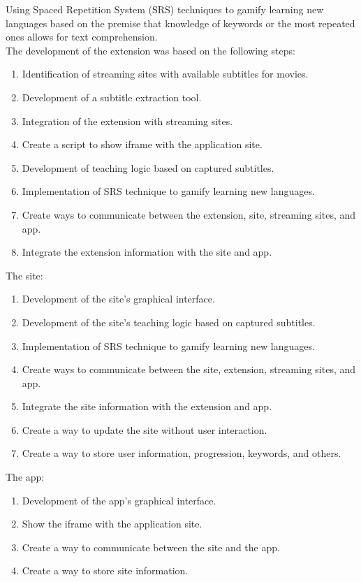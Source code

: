 \documentclass[12pt]{article}
\begin{document}
Using Spaced Repetition System (SRS) techniques to gamify learning new languages based on the premise that knowledge of keywords or the most repeated ones allows for text comprehension. \\
The development of the extension was based on the following steps: 
\begin{enumerate}
\item Identification of streaming sites with available subtitles for movies.
\item Development of a subtitle extraction tool.
\item Integration of the extension with streaming sites.
\item Create a script to show iframe with the application site.
\item Development of teaching logic based on captured subtitles.
\item Implementation of SRS technique to gamify learning new languages.
\item Create ways to communicate between the extension, site, streaming sites, and app.
\item Integrate the extension information with the site and app.
\end{enumerate}
The site: 

\begin{enumerate}
\item Development of the site's graphical interface.
\item Development of the site's teaching logic based on captured subtitles.
\item Implementation of SRS technique to gamify learning new languages.
\item Create ways to communicate between the site, extension, streaming sites, and app.
\item Integrate the site information with the extension and app.
\item Create a way to update the site without user interaction.
\item Create a way to store user information, progression, keywords, and others.
\end{enumerate}
The app:

\begin{enumerate}
\item Development of the app's graphical interface.
\item Show the iframe with the application site.
\item Create a way to communicate between the site and the app.
\item Create a way to store site information.
\end{enumerate}
\end{document}
